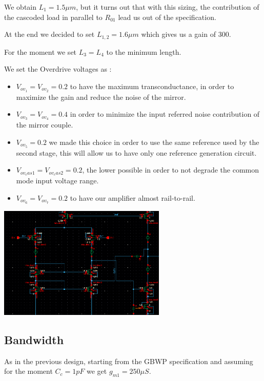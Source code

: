 We obtain $L_1=1.5 \mu m$, but it turns out that with this sizing, the contribution of the cascoded load in parallel to $R_{01}$ lead us out of the specification.

At the end we decided to set $L_{1,2} = 1.6 \mu m$ which gives us a gain of 300.

For the moment we set $L_3=L_4$ to the minimum length.

We set the Overdrive voltages as :

\begin{itemize}
	\item $V_{ov_1}=V_{ov_2}=0.2$ to have the maximum transconductance, in order to maximize the gain and reduce the noise of the mirror.

	\item $V_{ov_3}=V_{ov_4}=0.4$ in order to minimize the input referred noise contribution of the mirror couple.

	\item $V_{ov_5}=0.2$ we made this choice in order to use the same reference used by the second stage, this will allow us to have only one reference generation circuit.

	\item $V_{ov_cas1}=V_{ov_cas2}=0.2$, the lower possible in order to not degrade the common mode input voltage range.

	\item $V_{ov_6}=V_{ov_7}=0.2$ to have our amplifier almost rail-to-rail.

\end{itemize}


\centering
\includegraphics[width=0.6\textwidth]{Capitoli/dc.png}
\raggedright


\subsection{Bandwidth} %
\label{sub:bandwith}

As in the previous design, starting from the GBWP specification and assuming for the moment $C_c=1pF$ we get $g_{m1}= 250 \mu S$. 

